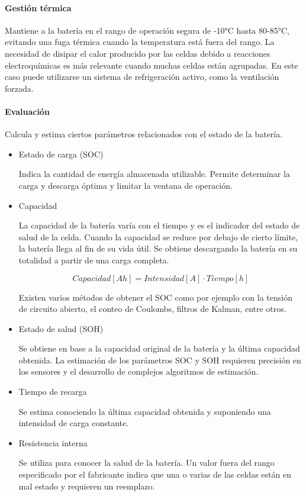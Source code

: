 \paragraph{Gestión térmica}
Mantiene a la batería en el rango de operación segura de -10°C hasta 80-85°C, evitando una fuga térmica cuando la temperatura está fuera del rango.  La necesidad de disipar el calor producido por las celdas debido a reacciones electroquímicas es más relevante cuando muchas celdas están agrupadas. En este caso puede utilizarse un sistema de refrigeración activo, como la ventilación forzada.

\paragraph{Evaluación}
Calcula y estima ciertos parámetros relacionados con el estado de la batería.

\begin{itemize}
    \item Estado de carga (SOC)

    Indica la cantidad de energía almacenada utilizable. Permite determinar la carga y descarga óptima y limitar la ventana de operación.

    \item Capacidad

    La capacidad de la batería varía con el tiempo y es el indicador del estado de salud de la celda. Cuando la capacidad se reduce por debajo de cierto límite, la batería llega al fin de su vida útil. Se obtiene descargando la batería en su totalidad a partir de una carga completa.

    $$ Capacidad[Ah] = Intensidad[A] \cdot Tiempo[h] $$

    Existen varios métodos de obtener el SOC como por ejemplo con la tensión de circuito abierto, el conteo de Coulombs, filtros de Kalman, entre otros.

    \item Estado de salud (SOH)

    Se obtiene en base a la capacidad original de la batería y la última capacidad obtenida. La estimación de los parámetros SOC y SOH requieren precisión en los sensores y el desarrollo de complejos algoritmos de estimación.

    \item Tiempo de recarga

    Se estima conociendo la última capacidad obtenida y suponiendo una intensidad de carga constante.

    \item Resistencia interna
    
    Se utiliza para conocer la salud de la batería. Un valor fuera del rango especificado por el fabricante indica que una o varias de las celdas están en mal estado y requieren un reemplazo.
\end{itemize}

